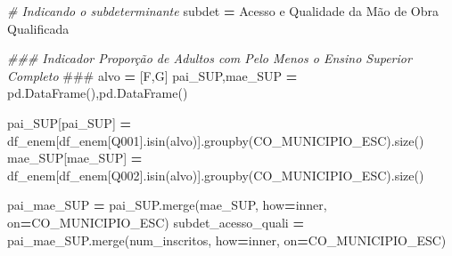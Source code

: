 \documentclass[
  12,
  dvipsnames]{article}
\newenvironment{Shaded}{\begin{snugshade}}{\end{snugshade}}
\newcommand{\AlertTok}[1]{\textcolor[rgb]{0.94,0.16,0.16}{#1}}
\newcommand{\CommentTok}[1]{\textcolor[rgb]{0.56,0.35,0.01}{\textit{#1}}}
\newcommand{\NormalTok}[1]{#1}
\newcommand{\OperatorTok}[1]{\textcolor[rgb]{0.81,0.36,0.00}{\textbf{#1}}}
\newcommand{\StringTok}[1]{\textcolor[rgb]{0.31,0.60,0.02}{#1}}
\begin{document}
\begin{Shaded}
\begin{Highlighting}[]
\CommentTok{\# Indicando o subdeterminante}
\NormalTok{subdet }\OperatorTok{=} \StringTok{\textquotesingle{}Acesso e Qualidade da Mão de Obra Qualificada\textquotesingle{}}

\CommentTok{\#\#\# Indicador Proporção de Adultos com Pelo Menos o Ensino Superior Completo }\AlertTok{\#\#\#}
\NormalTok{alvo }\OperatorTok{=}\NormalTok{ [}\StringTok{\textquotesingle{}F\textquotesingle{}}\NormalTok{,}\StringTok{\textquotesingle{}G\textquotesingle{}}\NormalTok{]}
\NormalTok{pai\_SUP,mae\_SUP }\OperatorTok{=}\NormalTok{ pd.DataFrame(),pd.DataFrame()}

\NormalTok{pai\_SUP[}\StringTok{\textquotesingle{}pai\_SUP\textquotesingle{}}\NormalTok{] }\OperatorTok{=}\NormalTok{ df\_enem[df\_enem[}\StringTok{\textquotesingle{}Q001\textquotesingle{}}\NormalTok{].isin(alvo)].groupby(}\StringTok{\textquotesingle{}CO\_MUNICIPIO\_ESC\textquotesingle{}}\NormalTok{).size()}
\NormalTok{mae\_SUP[}\StringTok{\textquotesingle{}mae\_SUP\textquotesingle{}}\NormalTok{] }\OperatorTok{=}\NormalTok{ df\_enem[df\_enem[}\StringTok{\textquotesingle{}Q002\textquotesingle{}}\NormalTok{].isin(alvo)].groupby(}\StringTok{\textquotesingle{}CO\_MUNICIPIO\_ESC\textquotesingle{}}\NormalTok{).size()}

\NormalTok{pai\_mae\_SUP }\OperatorTok{=}\NormalTok{ pai\_SUP.merge(mae\_SUP, how}\OperatorTok{=}\StringTok{\textquotesingle{}inner\textquotesingle{}}\NormalTok{, on}\OperatorTok{=}\StringTok{\textquotesingle{}CO\_MUNICIPIO\_ESC\textquotesingle{}}\NormalTok{)}
\NormalTok{subdet\_acesso\_quali }\OperatorTok{=}\NormalTok{ pai\_mae\_SUP.merge(num\_inscritos, how}\OperatorTok{=}\StringTok{\textquotesingle{}inner\textquotesingle{}}\NormalTok{, on}\OperatorTok{=}\StringTok{\textquotesingle{}CO\_MUNICIPIO\_ESC\textquotesingle{}}\NormalTok{)}


\end{Highlighting}
\end{Shaded}
\end{document}
